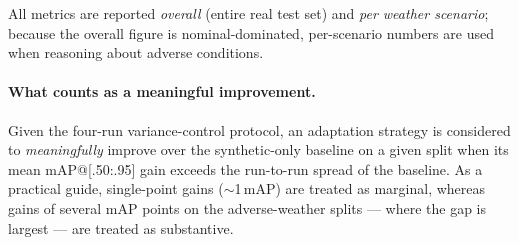 All metrics are reported \emph{overall} (entire real test set) and \emph{per weather
scenario}; because the overall figure is nominal-dominated, per-scenario numbers are
used when reasoning about adverse conditions.

\paragraph{What counts as a meaningful improvement.}
Given the four-run variance-control protocol, an adaptation strategy is considered to
\emph{meaningfully} improve over the synthetic-only baseline on a given split when its
mean mAP@[.50:.95] gain exceeds the run-to-run spread of the baseline. As a practical
guide, single-point gains ($\sim$1\,mAP) are treated as marginal, whereas gains of
several mAP points on the adverse-weather splits --- where the gap is largest --- are
treated as substantive.
